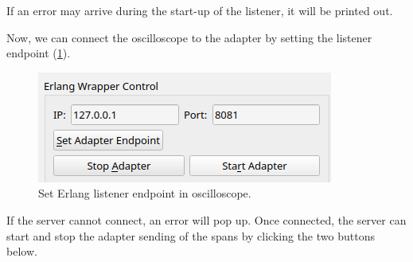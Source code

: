     If an error may arrive during the start-up of the listener, it will be printed out.

    Now, we can connect the oscilloscope to the adapter by setting the listener endpoint (\cref{fig:c_list}).
    
     \begin{figure}[H]
        \begin{center}
        \includegraphics[width = 0.8 \textwidth]{img/manual/endpoint.png}
        \end{center}
         \caption{Set Erlang listener endpoint in oscilloscope.}
         \label{fig:c_list}
    \end{figure}

    If the server cannot connect, an error will pop up. Once connected, the server can start and stop the adapter sending of the spans by clicking the two buttons below.

